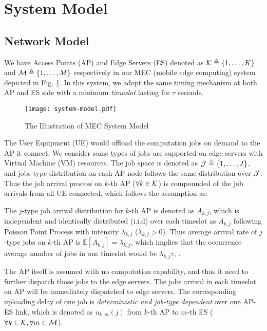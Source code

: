 \section{System Model}
\subsection{Network Model}
We have Access Points (AP) and Edge Servers (ES) denoted as $\mathcal{K} \triangleq \{1,\dots,K\}$ and $\mathcal{M} \triangleq \{1,\dots,M\}$ respectively in our MEC (mobile edge computing) system depicted in Fig. \ref{fig:system}. In this system, we adopt the same timing mechanism at both AP and ES side with a minimum \emph{timeslot} lasting for $\tau$ seconds.

\begin{figure}[ht]
    \centering
    \texttt{[image: system-model.pdf]}
    \caption{The Illustration of MEC System Model}
    \label{fig:system}
\end{figure}

The User Equipment (UE) would offload the computation jobs on demand to the AP it connect.
We consider some types of jobs are supported on edge servers with Virtual Machine (VM) resources. The job space is denoted as $\mathcal{J} \triangleq \{1,\dots, J\}$, and jobs type distribution on each AP node follows the same distribution over $\mathcal{J}$.
Thus the job arrival process on $k$-th AP ($\forall k\in\mathcal{K}$) is compounded of the job arrivals from all UE connected, which follows the assumption as:
\begin{assumption}
    The $j$-type job arrival distribution for $k$-th AP is denoted as $A_{k,j}$, which is independent and identically distributed (i.i.d) over each timeslot as $A_{k,j}$ following Poisson Point Process with intensity $\lambda_{k,j}$ ($\lambda_{k,j} > 0$). Thus average arrival rate of $j$-type jobs on $k$-th AP is $\mathbb{E}[A_{k,j}]=\lambda_{k,j}$, which implies that the occurrence average number of jobs in one timeslot would be $\lambda_{k,j}\tau$, .
\end{assumption}

The AP itself is assumed with no computation capability, and thus it need to further dispatch those jobs to the edge servers.
The jobs arrival in each timeslot on AP will be immediately dispatched to edge servers.
The corresponding uploading delay of one job is \emph{deterministic and job-type dependent} over one AP-ES link, which is denoted as $u_{k,m}(j)$ from $k$-th AP to $m$-th ES ($\forall k\in\mathcal{K}, \forall m\in\mathcal{M}$).

